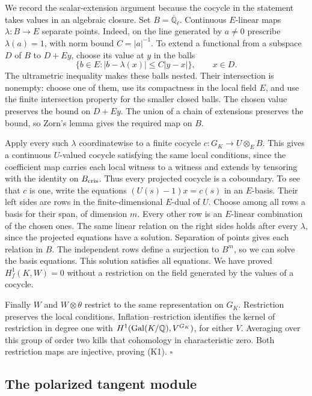 We record the scalar-extension argument because the cocycle in
the statement takes values in an algebraic closure. Set
\(B=\overline{\mathbb Q}_\ell\). Continuous \(E\)-linear maps
\(\lambda:B\to E\) separate points. Indeed, on the line generated
by \(a\ne0\) prescribe \(\lambda(a)=1\), with norm bound
\(C=|a|^{-1}\). To extend a functional from a subspace \(D\)
of \(B\) to \(D+Ey\), choose its value at \(y\) in the balls
\[
 \{b\in E: |b-\lambda(x)|\le C|y-x|\},\qquad x\in D.
\]
The ultrametric inequality makes these balls nested. Their
intersection is nonempty: choose one of them, use its compactness
in the local field \(E\), and use the finite intersection property
for the smaller closed balls. The chosen value preserves the
bound on \(D+Ey\). The union of a chain of extensions preserves
the bound, so Zorn's lemma gives the required map on \(B\).

Apply every such \(\lambda\) coordinatewise to a finite cocycle
\(c:G_K\to U\otimes_E B\). This gives a continuous \(U\)-valued
cocycle satisfying the same local conditions, since the coefficient
map carries each local witness to a witness and extends by tensoring
with the identity on \(B_{\rm cris}\). Thus every projected cocycle
is a coboundary. To see that \(c\) is one, write the equations
\((U(s)-1)x=c(s)\) in an \(E\)-basis. Their left sides are rows
in the finite-dimensional \(E\)-dual of \(U\). Choose among all
rows a basis for their span, of dimension \(m\). Every other row is an \(E\)-linear
combination of the chosen ones. The same linear relation on the
right sides holds after every \(\lambda\), since the projected
equations have a solution. Separation of points gives each relation
in \(B\). The independent rows define a surjection to \(B^m\), so we can solve the basis equations.
This solution satisfies all equations. We have proved
\(H^1_f(K,W)=0\) without a restriction on the field generated by
the values of a cocycle.

Finally \(W\) and \(W\otimes\theta\) restrict to the same
representation on \(G_K\). Restriction preserves the local conditions.
Inflation--restriction identifies the kernel of restriction in
degree one with \(H^1({\rm Gal}(K/\mathbb Q),V^{G_K})\), for either
\(V\). Averaging over this group of order two kills that cohomology
in characteristic zero. Both restriction maps are injective,
proving (K1). \(\square\)

\subsection{The polarized tangent module}

